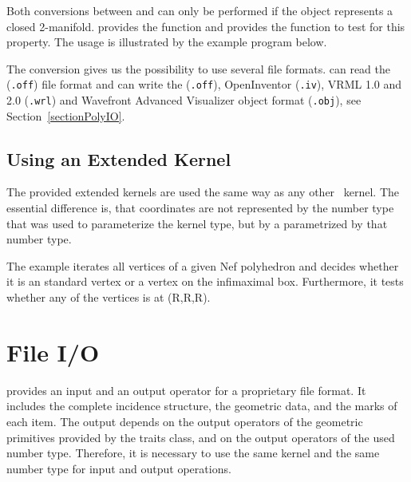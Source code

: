 Both conversions between  and  can only 
be performed if the object represents a closed 2-manifold. 
 provides the function  and 
 provides the function  to test for 
this property. The usage is illustrated by the example program below.

The conversion gives us the possibility to use several file formats. 
 can read
the ({\tt .off}) file format and can write the ({\tt .off}),
OpenInventor ({\tt .iv}), VRML 1.0 and 2.0 ({\tt .wrl}) and Wavefront Advanced
Visualizer object format ({\tt .obj}), see Section~\ref{sectionPolyIO}. 


\subsection{Using an Extended Kernel}

The provided extended kernels are used the same way as any other \cgal\ kernel.
The essential difference is, that coordinates are not represented by the number
type that was used to parameterize the kernel type, but by a 
parametrized by that number type.

The example iterates all vertices of a given Nef polyhedron and decides whether
it is an standard vertex or a vertex on the infimaximal box. Furthermore, it 
tests whether any of the vertices is at (R,R,R). 


\section{File I/O}
\label{sectionNef_3IO}

 provides an input and an output operator 
for a proprietary file format. It includes the 
complete incidence structure, the geometric data, and the marks of each item.
The output depends on the output operators of the geometric primitives 
provided by the traits class, and on the output operators of the used
number type. Therefore, it is necessary to use the same kernel and
the same number type for input and output operations.  

